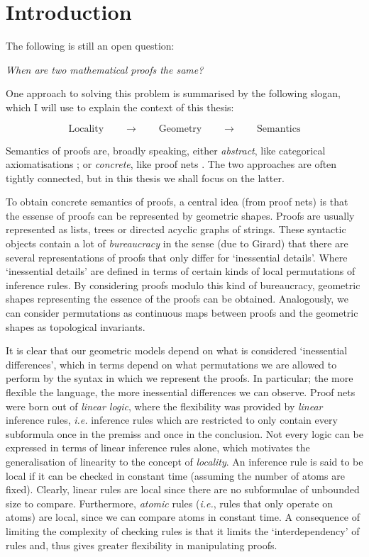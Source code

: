 \chapter{Introduction}


The following is still an open question:

\begin{centre}
\emph{When are two mathematical proofs the same?}
\end{centre}

One approach to solving this problem is summarised by the following slogan, which I will use to explain the context of this thesis:

\[
\mbox{Locality}\qquad\rightarrow\qquad\mbox{Geometry}\qquad\rightarrow\qquad\mbox{Semantics}
\]

Semantics of proofs are, broadly speaking, either \emph{abstract}, like categorical axiomatisations \cite{}; or \emph{concrete}, like proof nets \cite{}. The two approaches are often tightly connected, but in this thesis we shall focus on the latter.

To obtain concrete semantics of proofs, a central idea (from proof nets) is that the essense of proofs can be represented by geometric shapes. Proofs are usually represented as lists, trees or directed acyclic graphs of strings. These syntactic objects contain a lot of \emph{bureaucracy} in the sense (due to Girard) that there are several representations of proofs that only differ for `inessential details'. Where `inessential details' are defined in terms of certain kinds of local permutations of inference rules. By considering proofs modulo this kind of bureaucracy, geometric shapes representing the essence of the proofs can be obtained. Analogously, we can consider permutations as continuous maps between proofs and the geometric shapes as topological invariants.

It is clear that our geometric models depend on what is considered `inessential differences', which in terms depend on what permutations we are allowed to perform by the syntax in which we represent the proofs. In particular; the more flexible the language, the more inessential differences we can observe. Proof nets were born out of \emph{linear logic}, where the flexibility was provided by \emph{linear} inference rules, \emph{i.e.} inference rules which are restricted to only contain every subformula once in the premiss and once in the conclusion. Not every logic can be expressed in terms of linear inference rules alone, which motivates the generalisation of linearity to the concept of \emph{locality}. An inference rule is said to be local if it can be checked in constant time (assuming the number of atoms are fixed). Clearly, linear rules are local since there are no subformulae of unbounded size to compare. Furthermore, \emph{atomic} rules (\emph{i.e.}, rules that only operate on atoms) are local, since we can compare atoms in constant time. A consequence of limiting the complexity of checking rules is that it limits the `interdependency' of rules and, thus gives greater flexibility in manipulating proofs.

